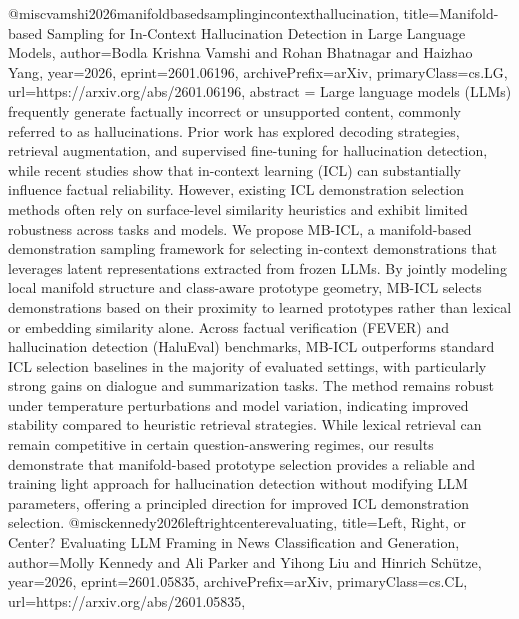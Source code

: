 {}@misc{vamshi2026manifoldbasedsamplingincontexthallucination,
      title={Manifold-based Sampling for In-Context Hallucination Detection in Large Language Models}, 
      author={Bodla Krishna Vamshi and Rohan Bhatnagar and Haizhao Yang},
      year={2026},
      eprint={2601.06196},
      archivePrefix={arXiv},
      primaryClass={cs.LG},
      url={https://arxiv.org/abs/2601.06196},
      abstract = {Large language models (LLMs) frequently generate factually incorrect or unsupported content, commonly referred to as hallucinations. Prior work has explored decoding strategies, retrieval augmentation, and supervised fine-tuning for hallucination detection, while recent studies show that in-context learning (ICL) can substantially influence factual reliability. However, existing ICL demonstration selection methods often rely on surface-level similarity heuristics and exhibit limited robustness across tasks and models.   We propose MB-ICL, a manifold-based demonstration sampling framework for selecting in-context demonstrations that leverages latent representations extracted from frozen LLMs. By jointly modeling local manifold structure and class-aware prototype geometry, MB-ICL selects demonstrations based on their proximity to learned prototypes rather than lexical or embedding similarity alone.   Across factual verification (FEVER) and hallucination detection (HaluEval) benchmarks, MB-ICL outperforms standard ICL selection baselines in the majority of evaluated settings, with particularly strong gains on dialogue and summarization tasks. The method remains robust under temperature perturbations and model variation, indicating improved stability compared to heuristic retrieval strategies. While lexical retrieval can remain competitive in certain question-answering regimes, our results demonstrate that manifold-based prototype selection provides a reliable and training light approach for hallucination detection without modifying LLM parameters, offering a principled direction for improved ICL demonstration selection.}
}@misc{kennedy2026leftrightcenterevaluating,
      title={Left, Right, or Center? Evaluating LLM Framing in News Classification and Generation}, 
      author={Molly Kennedy and Ali Parker and Yihong Liu and Hinrich Schütze},
      year={2026},
      eprint={2601.05835},
      archivePrefix={arXiv},
      primaryClass={cs.CL},
      url={https://arxiv.org/abs/2601.05835},
}
